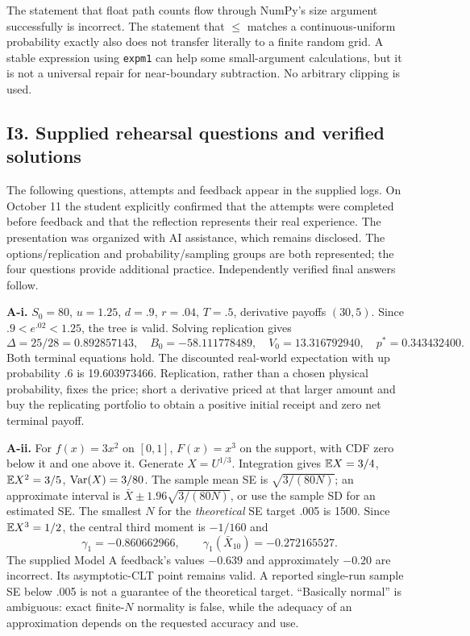 The statement that float path counts flow through NumPy's size argument successfully is incorrect. The statement that $\leq$ matches a continuous-uniform probability exactly also does not transfer literally to a finite random grid. A stable expression using \texttt{expm1} can help some small-argument calculations, but it is not a universal repair for near-boundary subtraction. No arbitrary clipping is used.

\subsection{I3. Supplied rehearsal questions and verified solutions}
The following questions, attempts and feedback appear in the supplied logs. On October 11 the student explicitly confirmed that the attempts were completed before feedback and that the reflection represents their real experience. The presentation was organized with AI assistance, which remains disclosed. The options/replication and probability/sampling groups are both represented; the four questions provide additional practice. Independently verified final answers follow.

\textbf{A-i.} $S_0=80$, $u=1.25$, $d=.9$, $r=.04$, $T=.5$, derivative payoffs $(30,5)$. Since $.9<e^{.02}<1.25$, the tree is valid. Solving replication gives
\[
\Delta=25/28=0.892857143,\quad B_0=-58.111778489,\quad
V_0=13.316792940,\quad p^*=0.343432400.
\]
Both terminal equations hold. The discounted real-world expectation with up probability .6 is 19.603973466. Replication, rather than a chosen physical probability, fixes the price; short a derivative priced at that larger amount and buy the replicating portfolio to obtain a positive initial receipt and zero net terminal payoff.

\textbf{A-ii.} For $f(x)=3x^2$ on $[0,1]$, $F(x)=x^3$ on the support, with CDF zero below it and one above it. Generate $X=U^{1/3}$. Integration gives $\mathbb E X=3/4$, $\mathbb E X^2=3/5$, $\operatorname{Var}(X)=3/80$. The sample mean SE is $\sqrt{3/(80N)}$; an approximate interval is $\bar X\pm1.96\sqrt{3/(80N)}$, or use the sample SD for an estimated SE. The smallest $N$ for the \emph{theoretical} SE target .005 is 1500. Since $\mathbb E X^3=1/2$, the central third moment is $-1/160$ and
\[
\gamma_1=-0.860662966,\qquad \gamma_1(\bar X_{10})=-0.272165527.
\]
The supplied Model A feedback's values $-0.639$ and approximately $-0.20$ are incorrect. Its asymptotic-CLT point remains valid. A reported single-run sample SE below .005 is not a guarantee of the theoretical target. ``Basically normal'' is ambiguous: exact finite-$N$ normality is false, while the adequacy of an approximation depends on the requested accuracy and use.

